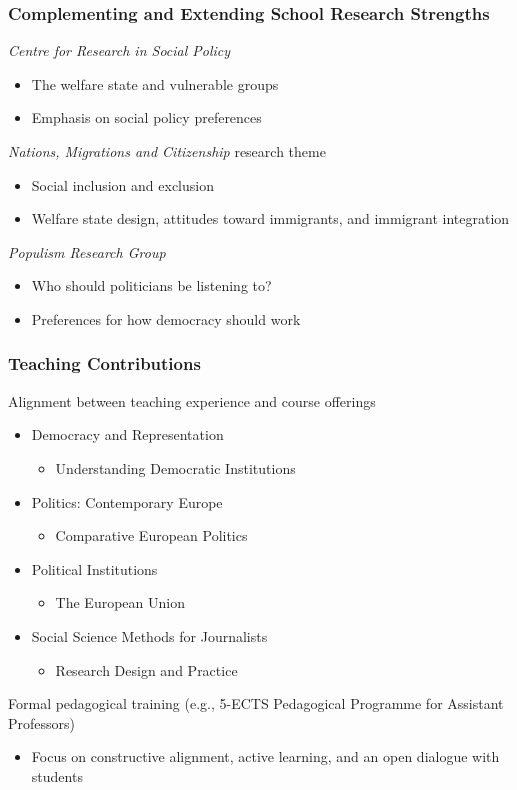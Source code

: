 \documentclass[14pt]{beamer}
\begin{document}
\begin{frame}
	\frametitle{Complementing and Extending School Research Strengths}
	\pause
	\textit{Centre for Research in Social Policy}
	\begin{itemize}
		\pause
		\item The welfare state and vulnerable groups
		\pause
		\item Emphasis on social policy preferences 
	\end{itemize}
	\pause
	\textit{Nations, Migrations and Citizenship} research theme
	\begin{itemize}
		\pause
		\item Social inclusion and exclusion
		\pause
		\item Welfare state design, attitudes toward immigrants, and immigrant integration
	\end{itemize}
	\pause
	\textit{Populism Research Group}
	\begin{itemize}
		\pause
		\item Who should politicians be listening to?
		\pause
		\item Preferences for how democracy should work 
	\end{itemize}
\end{frame}

\begin{frame}
	\frametitle{Teaching Contributions}
	\pause
	Alignment between teaching experience and course offerings
	\begin{itemize}
		\pause
		\item Democracy and Representation 
		\begin{itemize}
			\pause
			\item Understanding Democratic Institutions
		\end{itemize}
		\pause
		\item Politics: Contemporary Europe
		\begin{itemize}
			\pause
			\item Comparative European Politics
		\end{itemize}
		\pause
		\item Political Institutions
		\begin{itemize}
			\pause
			\item The European Union
		\end{itemize}
		\pause
		\item Social Science Methods for Journalists
		\begin{itemize}
			\pause
			\item Research Design and Practice
		\end{itemize}
	\end{itemize}
	\pause
	\bigskip
	Formal pedagogical training (e.g., 5-ECTS Pedagogical Programme for Assistant Professors)
	\begin{itemize}
		\pause
		\item Focus on constructive alignment, active learning, and an open dialogue with students
	\end{itemize}
\end{frame}
\end{document}
